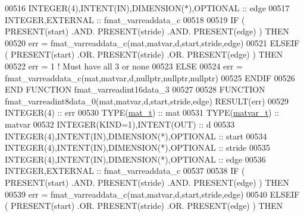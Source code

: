 \begin{DoxyCode}
00516     \textcolor{keywordtype}{INTEGER(4)},\textcolor{keywordtype}{INTENT(IN)},\textcolor{keywordtype}{DIMENSION(*)},\textcolor{keywordtype}{OPTIONAL}  :: edge
00517     \textcolor{keywordtype}{INTEGER},\textcolor{keywordtype}{EXTERNAL}                             :: fmat\_varreaddata\_c
00518 
00519     \textcolor{keywordflow}{IF} ( \textcolor{keyword}{PRESENT}(start) .AND. \textcolor{keyword}{PRESENT}(stride) .AND. \textcolor{keyword}{PRESENT}(edge) ) \textcolor{keywordflow}{THEN}
00520         err = fmat\_varreaddata\_c(mat,matvar,d,start,stride,edge)
00521     \textcolor{keywordflow}{ELSEIF} ( \textcolor{keyword}{PRESENT}(start) .OR. \textcolor{keyword}{PRESENT}(stride) .OR. \textcolor{keyword}{PRESENT}(edge) ) \textcolor{keywordflow}{THEN}
00522         err = 1    \textcolor{comment}{! Must have all 3 or none}
00523     \textcolor{keywordflow}{ELSE}
00524         err = fmat\_varreaddata\_c(mat,matvar,d,nullptr,nullptr,nullptr)
00525 \textcolor{keywordflow}{    ENDIF}
00526 \textcolor{keyword}{END FUNCTION }fmat\_varreadint16data\_3
00527 
00528 \textcolor{keyword}{FUNCTION }fmat\_varreadint8data\_0(mat,matvar,d,start,stride,edge) \textcolor{keyword}{RESULT}(err)
00529     \textcolor{keywordtype}{INTEGER(4)}                                  :: err
00530     \textcolor{keywordtype}{TYPE}(\hyperlink{group___m_a_t_gab0fc888f5a5d79943b16284b1f91c2e8}{mat\_t})                                 :: mat
00531     \textcolor{keywordtype}{TYPE}(\hyperlink{group___m_a_t_structmatvar__t}{matvar\_t})                              :: matvar
00532     \textcolor{keywordtype}{INTEGER(KIND=1)},\textcolor{keywordtype}{INTENT(OUT)}                 :: d
00533     \textcolor{keywordtype}{INTEGER(4)},\textcolor{keywordtype}{INTENT(IN)},\textcolor{keywordtype}{DIMENSION(*)},\textcolor{keywordtype}{OPTIONAL} :: start
00534     \textcolor{keywordtype}{INTEGER(4)},\textcolor{keywordtype}{INTENT(IN)},\textcolor{keywordtype}{DIMENSION(*)},\textcolor{keywordtype}{OPTIONAL} :: stride
00535     \textcolor{keywordtype}{INTEGER(4)},\textcolor{keywordtype}{INTENT(IN)},\textcolor{keywordtype}{DIMENSION(*)},\textcolor{keywordtype}{OPTIONAL} :: edge
00536     \textcolor{keywordtype}{INTEGER},\textcolor{keywordtype}{EXTERNAL}                            :: fmat\_varreaddata\_c
00537 
00538     \textcolor{keywordflow}{IF} ( \textcolor{keyword}{PRESENT}(start) .AND. \textcolor{keyword}{PRESENT}(stride) .AND. \textcolor{keyword}{PRESENT}(edge) ) \textcolor{keywordflow}{THEN}
00539         err = fmat\_varreaddata\_c(mat,matvar,d,start,stride,edge)
00540     \textcolor{keywordflow}{ELSEIF} ( \textcolor{keyword}{PRESENT}(start) .OR. \textcolor{keyword}{PRESENT}(stride) .OR. \textcolor{keyword}{PRESENT}(edge) ) \textcolor{keywordflow}{THEN}

\end{DoxyCode}
